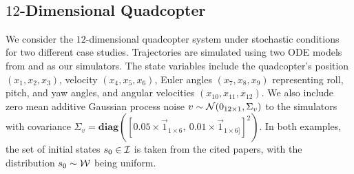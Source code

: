 \begin{table}
\hspace{1mm}
\vspace{-3mm}\\
\caption{Shows details of the experiments. The models are trained in parallel with $18$ CPU workers. Thus, the average training runtime may vary by selecting different number of workers. The words E, and A represent exact-star and approx-star, respectively.  }
\vspace{-6mm}
\label{tbl:expdetails}
\end{table}
\vspace{-2mm}
\subsection{$12$-Dimensional Quadcopter}
\vspace{-2mm}
We consider the $12$-dimensional quadcopter system under stochastic conditions for two different case studies. Trajectories are simulated using two ODE models from \cite{hashemi2024statistical} and \cite{hashemi2024scaling} as our simulators. The state variables include the quadcopter's position $(x_1, x_2, x_3)$, velocity $(x_4, x_5, x_6)$, Euler angles $(x_7, x_8, x_9)$ representing roll, pitch, and yaw angles, and angular velocities $(x_{10}, x_{11}, x_{12})$. We also include zero mean additive Gaussian process noise $v \sim \mathcal{N}(0_{12\times1}, \Sigma_v)$ to the simulators with covariance $\Sigma_v = \mathbf{diag}\left( [0.05 \times \vec{1}_{1\times6} ,\  0.01\times \vec{1}_{1\times6]}]^2 \right)$.  In both examples, the set of initial states $s_0 \in \mathcal{I}$ is taken from the cited papers, with the distribution $s_0 \sim \mathcal{W}$ being uniform.
\vspace{-2mm}
